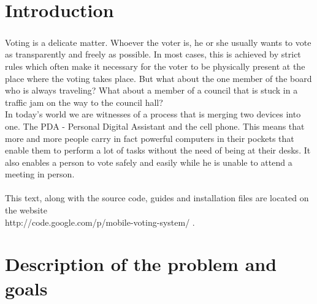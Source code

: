 \documentclass[11pt,twoside,a4paper]{book}
\begin{document}

% 
% 

\chapter*{Introduction}

\paragraph*{}
Voting is a delicate matter. Whoever the voter is, he or she usually wants to vote as transparently and freely as possible. In most cases, this is achieved by strict rules which often make it necessary for the voter to be physically present at the place where the voting takes place. But what about the one member of the board who is always traveling? What about a member of a council that is stuck in a traffic jam on the way to the council hall? \\
In today's world we are witnesses of a process that is merging two devices into one. The PDA - Personal Digital Assistant and the cell phone. This means that more and more people carry in fact powerful computers in their pockets that enable them to perform a lot of tasks without the need of being at their desks. It also enables a person to vote safely and easily while he is unable to attend a meeting in person. \\
\\
This text, along with the source code, guides and installation files are located on the website \\ http://code.google.com/p/mobile-voting-system/ .

\chapter{Description of the problem and goals}
\end{document}
